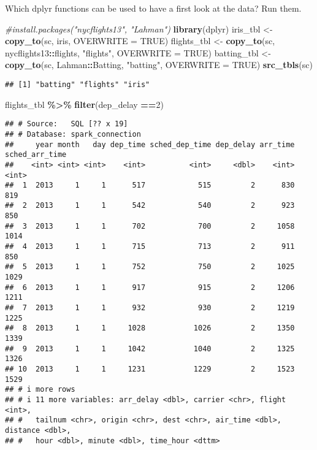 \documentclass[
]{article}
\newenvironment{Shaded}{\begin{snugshade}}{\end{snugshade}}
\newcommand{\AttributeTok}[1]{\textcolor[rgb]{0.13,0.29,0.53}{#1}}
\newcommand{\CommentTok}[1]{\textcolor[rgb]{0.56,0.35,0.01}{\textit{#1}}}
\newcommand{\ConstantTok}[1]{\textcolor[rgb]{0.56,0.35,0.01}{#1}}
\newcommand{\DecValTok}[1]{\textcolor[rgb]{0.00,0.00,0.81}{#1}}
\newcommand{\FunctionTok}[1]{\textcolor[rgb]{0.13,0.29,0.53}{\textbf{#1}}}
\newcommand{\NormalTok}[1]{#1}
\newcommand{\OtherTok}[1]{\textcolor[rgb]{0.56,0.35,0.01}{#1}}
\newcommand{\SpecialCharTok}[1]{\textcolor[rgb]{0.81,0.36,0.00}{\textbf{#1}}}
\newcommand{\StringTok}[1]{\textcolor[rgb]{0.31,0.60,0.02}{#1}}
\begin{document}
Which dplyr functions can be used to have a first look at the data? Run
them.

\begin{Shaded}
\begin{Highlighting}[]
\CommentTok{\#install.packages("nycflights13", "Lahman")}
\FunctionTok{library}\NormalTok{(dplyr)}
\NormalTok{iris\_tbl }\OtherTok{\textless{}{-}} \FunctionTok{copy\_to}\NormalTok{(sc, iris, }\AttributeTok{OVERWRITE =} \ConstantTok{TRUE}\NormalTok{)}
\NormalTok{flights\_tbl }\OtherTok{\textless{}{-}} \FunctionTok{copy\_to}\NormalTok{(sc, nycflights13}\SpecialCharTok{::}\NormalTok{flights, }\StringTok{"flights"}\NormalTok{, }\AttributeTok{OVERWRITE =} \ConstantTok{TRUE}\NormalTok{)}
\NormalTok{batting\_tbl }\OtherTok{\textless{}{-}} \FunctionTok{copy\_to}\NormalTok{(sc, Lahman}\SpecialCharTok{::}\NormalTok{Batting, }\StringTok{"batting"}\NormalTok{, }\AttributeTok{OVERWRITE =} \ConstantTok{TRUE}\NormalTok{)}
\FunctionTok{src\_tbls}\NormalTok{(sc)}
\end{Highlighting}
\end{Shaded}

\begin{verbatim}
## [1] "batting" "flights" "iris"
\end{verbatim}

\begin{Shaded}
\begin{Highlighting}[]
\NormalTok{flights\_tbl }\SpecialCharTok{\%\textgreater{}\%} \FunctionTok{filter}\NormalTok{(dep\_delay }\SpecialCharTok{==}\DecValTok{2}\NormalTok{)}
\end{Highlighting}
\end{Shaded}

\begin{verbatim}
## # Source:   SQL [?? x 19]
## # Database: spark_connection
##     year month   day dep_time sched_dep_time dep_delay arr_time sched_arr_time
##    <int> <int> <int>    <int>          <int>     <dbl>    <int>          <int>
##  1  2013     1     1      517            515         2      830            819
##  2  2013     1     1      542            540         2      923            850
##  3  2013     1     1      702            700         2     1058           1014
##  4  2013     1     1      715            713         2      911            850
##  5  2013     1     1      752            750         2     1025           1029
##  6  2013     1     1      917            915         2     1206           1211
##  7  2013     1     1      932            930         2     1219           1225
##  8  2013     1     1     1028           1026         2     1350           1339
##  9  2013     1     1     1042           1040         2     1325           1326
## 10  2013     1     1     1231           1229         2     1523           1529
## # i more rows
## # i 11 more variables: arr_delay <dbl>, carrier <chr>, flight <int>,
## #   tailnum <chr>, origin <chr>, dest <chr>, air_time <dbl>, distance <dbl>,
## #   hour <dbl>, minute <dbl>, time_hour <dttm>
\end{verbatim}
\end{document}
